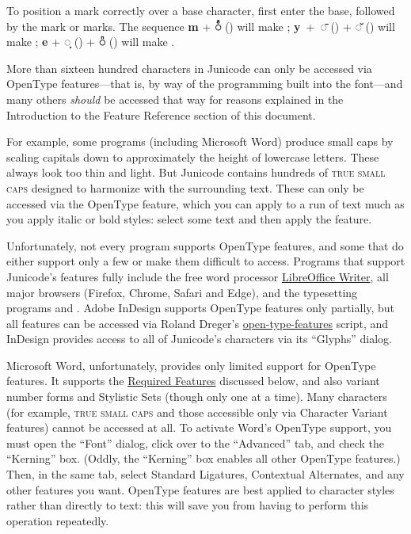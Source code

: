 To position a mark correctly over a base character, first enter the base,
followed by the mark or marks.
The sequence \textbf{m} + \textbf{◌ᷙ} ()
will make ;
\mbox{\textbf{y} + \textbf{◌̄}} () + \textbf{◌̆} () will make ;
\textbf{e} + \textbf{◌̣} () + \textbf{◌ᷠ} () will make .

More than sixteen hundred characters in Junicode can only be accessed via OpenType features—that is,
by way of the programming built into the font—and many others \textit{should} be
accessed that way for reasons explained in the Introduction
to the Feature Reference section of this document.

For example, some programs (including Microsoft Word) produce small caps by
scaling capitals down to approximately the height of lowercase letters.
These always look too thin and light.
But Junicode contains hundreds of \textsc{true small caps} designed to harmonize with
the surrounding text. These can only be accessed via the OpenType  feature,
which you can apply to a run of text much as you apply italic or bold styles:
select some text and then apply the feature.

Unfortunately, not every program supports OpenType features, and some that do
either support only a few or make them difficult to access. Programs
that support Junicode’s features fully include the free word processor
\href{https://www.libreoffice.org/}{LibreOffice Writer}, all major browsers
(Firefox, Chrome, Safari and Edge), and
the typesetting programs {\LuaLaTeX} and {\XeLaTeX}. Adobe InDesign supports
OpenType features only partially, but all features can be accessed via
Roland Dreger’s \href{https://github.com/RolandDreger/open-type-features}{open-type-features}
script, and InDesign provides access to
all of Junicode's characters via its “Glyphs” dialog.

Microsoft Word, unfortunately, provides only limited support for OpenType
features. It supports the \hyperlink{req}{Required Features} discussed below, and also
variant number forms and Stylistic Sets (though only one at a time). Many characters
(for example, \textsc{true small caps} and those accessible only via Character
Variant features) cannot be accessed at all. To activate Word's OpenType
support, you must open the “Font” dialog, click over to the “Advanced” tab,
and check the “Kerning” box. (Oddly, the “Kerning” box enables all other
OpenType features.) Then, in the same tab, select Standard Ligatures, Contextual
Alternates, and any other features you want.
OpenType features are best applied to character styles rather than
directly to text: this will
save you from having to perform this operation repeatedly.

